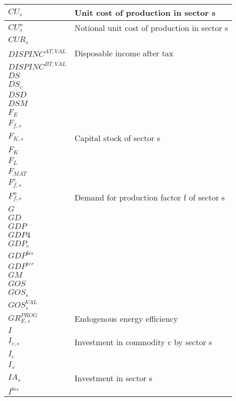 \documentclass[12pt]{article}
\numberwithin{equation}{section}
\begin{document}
\begin{longtable}{@{}p{4cm}p{9cm}@{}}
 \midrule 
$CU_{s}$ & Unit cost of production in sector s \\
 \midrule 
$CU^{n}_{s}$ & Notional unit cost of production in sector s \\
 \midrule 
$CUR_{s}$ &  \\
 \midrule 
$DISPINC^{AT,VAL}$ & Disposable income after tax \\
 \midrule 
$DISPINC^{BT,VAL}$ &  \\
 \midrule 
$DS$ &  \\
 \midrule 
$DS_{c}$ &  \\
 \midrule 
$DSD$ &  \\
 \midrule 
$DSM$ &  \\
 \midrule 
$F_{E}$ &  \\
 \midrule 
$F_{f, s}$ &  \\
 \midrule 
$F_{K, s}$ & Capital stock of sector s \\
 \midrule 
$F_{K}$ &  \\
 \midrule 
$F_{L}$ &  \\
 \midrule 
$F_{MAT}$ &  \\
 \midrule 
$F^{e}_{f, s}$ &  \\
 \midrule 
$F^{n}_{f, s}$ & Demand for production factor f of sector s \\
 \midrule 
$G$ &  \\
 \midrule 
$GD$ &  \\
 \midrule 
$GDP$ &  \\
 \midrule 
$GDP4$ &  \\
 \midrule 
$GDP_{c}$ &  \\
 \midrule 
$GDP^{bis}$ &  \\
 \midrule 
$GDP^{ter}$ &  \\
 \midrule 
$GM$ &  \\
 \midrule 
$GOS$ &  \\
 \midrule 
$GOS_{s}$ &  \\
 \midrule 
$GOS^{VAL}_{s}$ &  \\
 \midrule 
$GR^{PROG}_{E, s}$ & Endogenous energy efficiency \\
 \midrule 
$I$ &  \\
 \midrule 
$I_{c, s}$ & Investment in commodity c by sector s \\
 \midrule 
$I_{c}$ &  \\
 \midrule 
$I_{s}$ &  \\
 \midrule 
$IA_{s}$ & Investment in sector s \\
 \midrule 
$I^{bis}$ &  \\
 \midrule 

\end{longtable}
\end{document}
